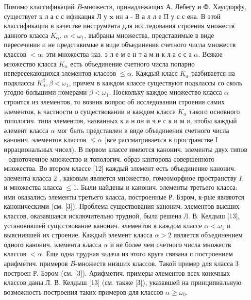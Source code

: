 \documentclass[10pt]{article}
\begin{document}
Помимо классификаций $B$-множеств, принадлежащих А. Лебегу и Ф. Хаусдорфу, существует к л а с с ификация Л у $\mathbf{x}$ ин а - В а л л е П у с с ена. В этой классификации в качестве инструмента для исс.тедования строения множеств данного класса $K_{\alpha}$, $\alpha<\omega_{1}$, выбраны множества, представимые в виде пересечения и не представимые в виде объединения счетного числа множеств классов $<\alpha$; эти множества наз. э л е м е н т а м и к л а с с а $\alpha$. Всякое множество класса $K_{\alpha}$ есть объединение счетного числа попарно непересекающихся элементов классов $\leqslant \alpha$. Каждый класс $K_{\alpha}$ разбивается на подклассы $K_{\alpha}^{\beta}, \beta<\omega_{1}$, причем в каждом классе существуют подклассы со сколь угодно большими номерами $\beta<\omega_{1}$. Поскольку каждое множество класса $\alpha$ строится из элементов, то возник вопрос об исследовании строения самих элементов, в частности о существовании в каждом классе $K_{\alpha}$ такого основного топологич. типа элементов, названных к а н он и ч е с к и м и, чтобы каждый әлемент класса $\alpha$ мог быть представлен в виде объединения счетного числа канонич. элементов классов $\leqslant \alpha$ (все рассматривается в пространстве I иррациональных чисел). В первом классе имеются канонич. элементы двух типов - одноточечное множество и топологич. образ канторова совершенного множества. Во втором классе [12] каждый элемент есть объединение канонич. элемента класса 2 , каковым является множество, гомеоморфное пространству $I$, и множества класса $\leqslant 1$. Были найдены и канонич. элементы третьего класса: ими оказались элементы третьего класса, построенные Р. Бэром, к-рые являются каноническими (см. [3]). Проблема существования канонич. элементов высших классов, оказавшаяся исключительно трудной, была решена Л. В. Келдыш [13], установившей сущсствование канонич. элементов в каждом классе $\alpha<\omega_{1}$ и выяснившей их строение. Каждый элемент класса $\alpha>2$ является объединением одного канонич. элемента класса $\alpha$ и не более чем счетного числа множеств классов $<\alpha$. Еще одна трудная задача из этого круга связана с построением арифметич. примеров $B$-множеств низших классов. Такой пример для класса 3 построен Р. Бэром (см. [3]). Арифметич. примеры әлементов всех конечных классов даны Л. В. Келдыш [13] (см. также [3]), указавшей на принципиальную возможность построения таких примеров для классов $\alpha \geqslant \omega_{0}$.
\end{document}

